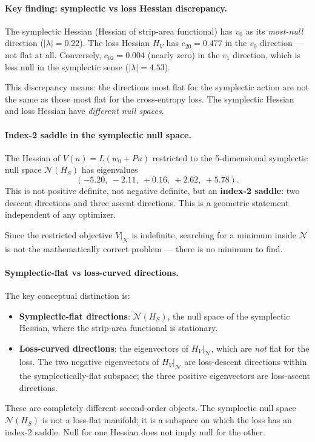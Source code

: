 \documentclass[11pt]{amsart}
\begin{document}
\paragraph{Key finding: symplectic vs loss Hessian discrepancy.}

The symplectic Hessian (Hessian of strip-area functional)
has $v_0$ as its \emph{most-null} direction ($|\lambda| = 0.22$).
The loss Hessian $H_V$ has $c_{20} = 0.477$ in the $v_0$ direction ---
not flat at all.
Conversely, $c_{02} = 0.004$ (nearly zero) in the $v_1$ direction,
which is less null in the symplectic sense ($|\lambda| = 4.53$).

This discrepancy means: the directions most flat for the symplectic
action are not the same as those most flat for the cross-entropy loss.
The symplectic Hessian and loss Hessian have \emph{different null spaces}.

\paragraph{Index-2 saddle in the symplectic null space.}

The Hessian of $V(u) = L(w_0 + Pu)$ restricted to the 5-dimensional
symplectic null space $\mathcal{N}(H_S)$ has eigenvalues
\[
  (-5.20,\ -2.11,\ +0.16,\ +2.62,\ +5.78).
\]
This is not positive definite, not negative definite, but an
\textbf{index-2 saddle}: two descent directions and three ascent directions.
This is a geometric statement independent of any optimizer.

Since the restricted objective $V|_{\mathcal{N}}$ is indefinite,
searching for a minimum inside $\mathcal{N}$ is not the mathematically
correct problem --- there is no minimum to find.

\paragraph{Symplectic-flat vs loss-curved directions.}

The key conceptual distinction is:
\begin{itemize}
\item \textbf{Symplectic-flat directions}: $\mathcal{N}(H_S)$,
  the null space of the symplectic Hessian, where the strip-area
  functional is stationary.
\item \textbf{Loss-curved directions}: the eigenvectors of
  $H_V|_{\mathcal{N}}$, which are \emph{not} flat for the loss.
  The two negative eigenvectors of $H_V|_{\mathcal{N}}$ are loss-descent
  directions within the symplectically-flat subspace;
  the three positive eigenvectors are loss-ascent directions.
\end{itemize}
These are completely different second-order objects.
The symplectic null space $\mathcal{N}(H_S)$ is not a loss-flat manifold;
it is a subspace on which the loss has an index-2 saddle.
Null for one Hessian does not imply null for the other.
\end{document}
